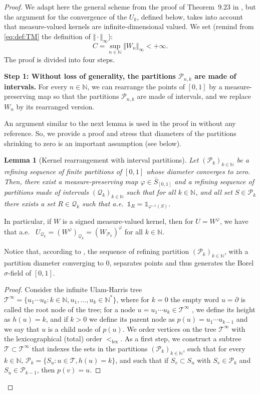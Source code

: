 \documentclass{amsart}
\newcommand{\aE}{a.e.\ }
\theoremstyle{plain}
\newtheorem{lemme}[Th]{Lemma}
\theoremstyle{definition}
\newcommand{\cP}{\mathcal{P}}
\newcommand{\cQ}{\mathcal{Q}}
\newcommand{\cT}{\mathcal{T}}
\newcommand{\TM}[1]{\norm{#1}_\infty}
\newcommand{\Relabel}{\bar{S}_{[0,1]}}
\newcommand{\ind}{\mathds{1}}
\newcommand{\rooot}{\partial} %
\newcommand{\N}{\mathbb{N}}
\newcommand{\norm}[1]{\Vert#1\Vert}
\newcommand{\linflex}{<_{\mathrm{lex}}}
\begin{document}
\begin{proof}
We adapt here the general scheme from the proof of Theorem~9.23 in \cite{Lovasz},
but the argument for the convergence of the $U_k$, defined below, 
takes into  account that  measure-valued
kernels are infinite-dimensional valued.
We set (remind from \eqref{eq:def:TM} the definition of $\TM{\cdot}$):
\[
  C=\sup_{n\in \N} \TM{W_n}<+\infty .
\]
The proof is divided into four steps.

\textbf{Step 1: Without loss of generality, the partitions
  $\mathcal{P}_{n,k}$ are made of intervals.} 
For every $n\in \N$,
we can rearrange the points of $[0,1]$ by a measure-preserving map 
so that the partitions $\mathcal{P}_{n,k}$ are made of intervals,
and we replace $W_n$ by its rearranged version. 



An argument similar to the next lemma  
is used in the proof in \cite[Proof of Theorem 9.23]{Lovasz} without any reference.
So, we provide a proof
and stress that   diameters of the partitions shrinking to zero
is an important assumption
(see  below).



\begin{lemme}[Kernel rearrangement with interval partitions]
	\label{lemma_part_intervals}
Let $(\cP_k)_{k\in\N}$ be a refining sequence of finite partitions of $[0,1]$
	whose diameter converges to zero.
Then, there exist a measure-preserving map $\varphi\in\Relabel$ and a
refining sequence of partitions made of intervals  $(\cQ_k)_{k\in\N}$ 
such that  for all $k\in\N$, and all set $S\in\cP_k$
	there exists a set $R\in\cQ_k$ such that \aE $\ind_{R} = \ind_{\varphi^{-1}(S)}$.
\end{lemme}

In particular, if $W$ is a signed measure-valued kernel,
then for $U=W^\varphi$,
we have that \aE  
$U_{\cQ_k} = (W^\varphi)_{\cQ_k} = (W_{\cP_k})^\varphi$
for all $k\in\N$.

Notice that, according to ,
the sequence  of refining partition $(\cP_{k})_{k\in\N}$,
  with a partition diameter converging to $0$, separates points and thus
  generates the Borel $\sigma$-field of $[0,1]$.

\begin{proof}
Consider the infinite Ulam-Harris tree $\cT^\infty = \{ u_1 \cdots u_k : k\in\N, u_1, \dots, u_k \in \N^* \}$, 
where for $k=0$ the empty word $u=\rooot$
	is called the root node of the tree;
for a node $u = u_1 \cdots u_k \in \cT^\infty$ ,
we define its height as $h(u)=k$,
and if $k>0$ we define its parent node as $p(u) = u_1 \cdots u_{k-1}$
	and we say that $u$ is a child node of $p(u)$.
We order vertices on the tree $\cT^\infty$ with the lexicographical (total) order
$\linflex$.
As a first step, we construct a subtree $\cT\subset\cT^\infty$
	that indexes the sets in the partitions $(\cP_k)_{k\in\N}$,
	such that for every $k\in\N$,
		$\cP_k = \{ S_u : u\in\cT, h(u)=k \}$,
	and such that if $S_v \subset S_u$ with $S_v\in\cP_{k}$ and $S_u\in\cP_{k-1}$,
		then $p(v) = u$.


\end{proof}
\end{proof}
\end{document}
